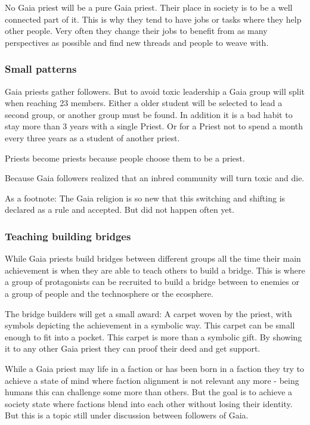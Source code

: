 No Gaia priest will be a pure Gaia priest. Their place in society is to be a well connected part of it. This is why they tend to have jobs or tasks where they help other people. Very often they change their jobs to benefit from as many perspectives as possible and find new threads and people to weave with.

\subsubsection{Small patterns}

Gaia priests gather followers. But to avoid toxic leadership a Gaia group will split when reaching 23 members. Either a older student will be selected to lead a second group, or another group must be found. In addition it is a bad habit to stay more than 3 years with a single Priest. Or for a Priest not to spend a month every three years as a student of another priest.

Priests become priests because people choose them to be a priest.

Because Gaia followers realized that an inbred community will turn toxic and die.

As a footnote: The Gaia religion is so new that this switching and shifting is declared as a rule and accepted. But did not happen often yet.

\subsubsection{Teaching building bridges}

While Gaia priests build bridges between different groups all the time their main achievement is when they are able to teach others to build a bridge. This is where a group of protagonists can be recruited to build a bridge between to enemies or a group of people and the technosphere or the ecosphere.

The bridge builders will get a small award: A carpet woven by the priest, with symbols depicting the achievement in a symbolic way. This carpet can be small enough to fit into a pocket. This carpet is more than a symbolic gift. By showing it to any other Gaia priest they can proof their deed and get support.

While a Gaia priest may life in a faction or has been born in a faction they try to achieve a state of mind where faction alignment is not relevant any more - being humans this can challenge some more than others. But the goal is to achieve a society state where factions blend into each other without losing their identity. But this is a topic still under discussion between followers of Gaia.

